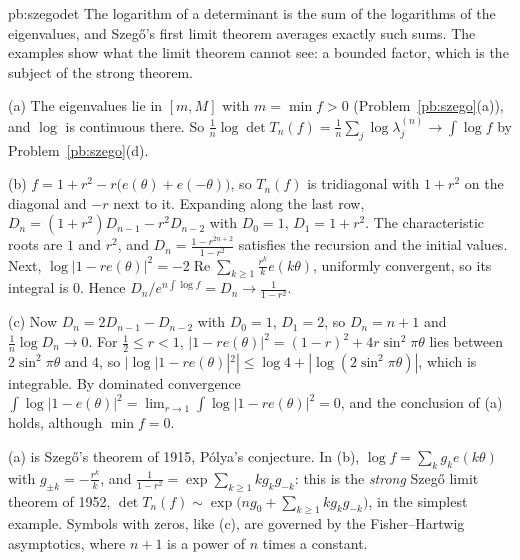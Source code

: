 \begin{solution}{pb:szegodet}
\idea The logarithm of a determinant is the sum of the logarithms of the eigenvalues, and Szegő's first limit theorem averages exactly such sums. The examples show what the limit theorem cannot
see: a bounded factor, which is the subject of the strong theorem.

\writeup (a) The eigenvalues lie in $[m,M]$ with $m=\min f>0$ (Problem~\ref{pb:szego}(a)), and $\log$ is continuous there. So $\frac1n\log\det T_n(f)=\frac1n\sum_j\log\lambda_j^{(n)}\to\int\log f$ by
Problem~\ref{pb:szego}(d).

(b) $f=1+r^2-r\bigl(e(\theta)+e(-\theta)\bigr)$, so $T_n(f)$ is tridiagonal with $1+r^2$ on the diagonal and $-r$ next to it. Expanding along the last row,
$D_n=(1+r^2)D_{n-1}-r^2D_{n-2}$ with $D_0=1$, $D_1=1+r^2$. The characteristic roots are $1$ and $r^2$, and $D_n=\frac{1-r^{2n+2}}{1-r^2}$ satisfies the recursion and the initial values. Next,
$\log|1-re(\theta)|^2=-2\operatorname{Re}\sum_{k\ge1}\frac{r^k}ke(k\theta)$, uniformly convergent, so its integral is $0$. Hence $D_n/e^{n\int\log f}=D_n\to\frac1{1-r^2}$.

(c) Now $D_n=2D_{n-1}-D_{n-2}$ with $D_0=1$, $D_1=2$, so $D_n=n+1$ and $\frac1n\log D_n\to0$. For $\frac12\le r<1$, $|1-re(\theta)|^2=(1-r)^2+4r\sin^2\pi\theta$ lies between $2\sin^2\pi\theta$ and $4$, so
$|\log|1-re(\theta)|^2|\le\log4+|\log(2\sin^2\pi\theta)|$, which is integrable. By dominated convergence $\int\log|1-e(\theta)|^2=\lim_{r\to1}\int\log|1-re(\theta)|^2=0$, and the conclusion of (a)
holds, although $\min f=0$.

\leads (a) is Szegő's theorem of 1915, Pólya's conjecture. In (b), $\log f=\sum_kg_ke(k\theta)$ with $g_{\pm k}=-\frac{r^k}k$, and $\frac1{1-r^2}=\exp\sum_{k\ge1}kg_kg_{-k}$: this is the \emph{strong} Szegő limit
theorem of 1952, $\det T_n(f)\sim\exp\bigl(ng_0+\sum_{k\ge1}kg_kg_{-k}\bigr)$, in the simplest example. Symbols with zeros, like (c), are governed by the Fisher--Hartwig asymptotics, where $n+1$ is a
power of $n$ times a constant.
\end{solution}

